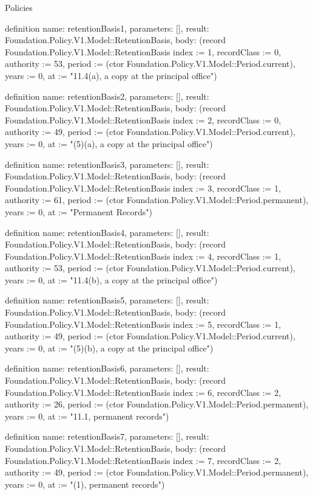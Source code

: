 \begin{lexlean}{Policies}
\begin{semanticmodule}
definition{
  name: retentionBasis1,
  parameters: [],
  result: Foundation.Policy.V1.Model::RetentionBasis,
  body: (record Foundation.Policy.V1.Model::RetentionBasis {index := 1, recordClass := 0, authority := 53, period := (ctor Foundation.Policy.V1.Model::Period.current), years := 0, at := "11.4(a), a copy at the principal office"})
}

definition{
  name: retentionBasis2,
  parameters: [],
  result: Foundation.Policy.V1.Model::RetentionBasis,
  body: (record Foundation.Policy.V1.Model::RetentionBasis {index := 2, recordClass := 0, authority := 49, period := (ctor Foundation.Policy.V1.Model::Period.current), years := 0, at := "(5)(a), a copy at the principal office"})
}

definition{
  name: retentionBasis3,
  parameters: [],
  result: Foundation.Policy.V1.Model::RetentionBasis,
  body: (record Foundation.Policy.V1.Model::RetentionBasis {index := 3, recordClass := 1, authority := 61, period := (ctor Foundation.Policy.V1.Model::Period.permanent), years := 0, at := "Permanent Records"})
}

definition{
  name: retentionBasis4,
  parameters: [],
  result: Foundation.Policy.V1.Model::RetentionBasis,
  body: (record Foundation.Policy.V1.Model::RetentionBasis {index := 4, recordClass := 1, authority := 53, period := (ctor Foundation.Policy.V1.Model::Period.current), years := 0, at := "11.4(b), a copy at the principal office"})
}

definition{
  name: retentionBasis5,
  parameters: [],
  result: Foundation.Policy.V1.Model::RetentionBasis,
  body: (record Foundation.Policy.V1.Model::RetentionBasis {index := 5, recordClass := 1, authority := 49, period := (ctor Foundation.Policy.V1.Model::Period.current), years := 0, at := "(5)(b), a copy at the principal office"})
}

definition{
  name: retentionBasis6,
  parameters: [],
  result: Foundation.Policy.V1.Model::RetentionBasis,
  body: (record Foundation.Policy.V1.Model::RetentionBasis {index := 6, recordClass := 2, authority := 26, period := (ctor Foundation.Policy.V1.Model::Period.permanent), years := 0, at := "11.1, permanent records"})
}

definition{
  name: retentionBasis7,
  parameters: [],
  result: Foundation.Policy.V1.Model::RetentionBasis,
  body: (record Foundation.Policy.V1.Model::RetentionBasis {index := 7, recordClass := 2, authority := 49, period := (ctor Foundation.Policy.V1.Model::Period.permanent), years := 0, at := "(1), permanent records"})
}


\end{semanticmodule}
\end{lexlean}
